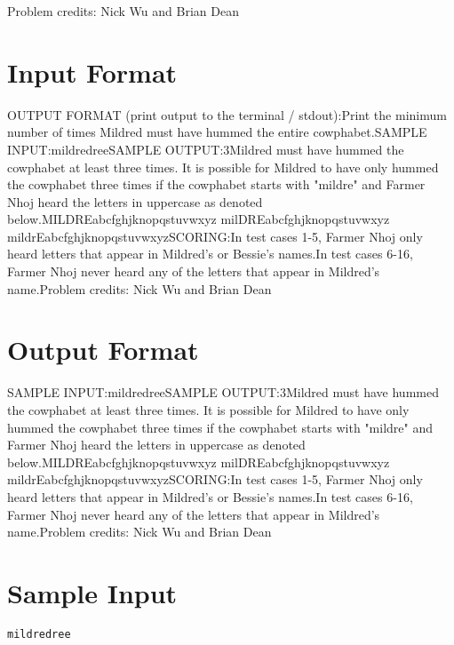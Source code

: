 \documentclass[12pt]{article}
\begin{document}
Problem credits: Nick Wu and Brian Dean



\section*{Input Format}
OUTPUT FORMAT (print output to the terminal / stdout):Print the minimum number of times Mildred must have hummed the entire cowphabet.SAMPLE INPUT:mildredreeSAMPLE OUTPUT:3Mildred must have hummed the cowphabet at least three times. It is possible for
Mildred to have only hummed the cowphabet three times if the cowphabet starts
with "mildre" and Farmer Nhoj heard the letters in uppercase as denoted below.MILDREabcfghjknopqstuvwxyz
milDREabcfghjknopqstuvwxyz
mildrEabcfghjknopqstuvwxyzSCORING:In test cases 1-5, Farmer Nhoj only heard letters that appear in Mildred's
or Bessie's names.In test cases 6-16, Farmer Nhoj never heard any of the letters that appear
in Mildred's name.Problem credits: Nick Wu and Brian Dean

\section*{Output Format}
SAMPLE INPUT:mildredreeSAMPLE OUTPUT:3Mildred must have hummed the cowphabet at least three times. It is possible for
Mildred to have only hummed the cowphabet three times if the cowphabet starts
with "mildre" and Farmer Nhoj heard the letters in uppercase as denoted below.MILDREabcfghjknopqstuvwxyz
milDREabcfghjknopqstuvwxyz
mildrEabcfghjknopqstuvwxyzSCORING:In test cases 1-5, Farmer Nhoj only heard letters that appear in Mildred's
or Bessie's names.In test cases 6-16, Farmer Nhoj never heard any of the letters that appear
in Mildred's name.Problem credits: Nick Wu and Brian Dean

\section*{Sample Input}
\begin{verbatim}
mildredree
\end{verbatim}
\end{document}

